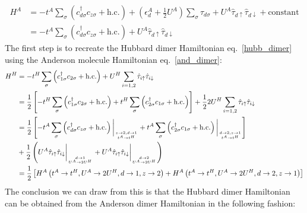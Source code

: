 \documentclass{article}
\numberwithin{equation}{section}
\begin{document}
\begin{equation}\begin{aligned}
	\label{and_dimer}
	H^A &= -t^A\sum_{\sigma}\left(c^\dagger_{d\sigma}c_{z\sigma} + \text{h.c.}\right) + \left(\epsilon_d^A + \frac{1}{2}U^A\right) \sum_{\sigma}\hat \tau_{d\sigma} + U^A\hat \tau_{d \uparrow}\hat \tau_{d \downarrow} + \text{constant}\\
	    &= -t^A\sum_{\sigma}\left(c^\dagger_{d\sigma}c_{z\sigma} + \text{h.c.}\right) + U^A\hat \tau_{d \uparrow}\hat \tau_{d \downarrow}
\end{aligned}\end{equation}
The first step is to recreate the Hubbard dimer Hamiltonian eq.~\ref{hubb_dimer} using the Anderson molecule Hamiltonian eq.~\ref{and_dimer}:
\begin{equation}\begin{aligned}
	H^H &= -t^H\sum_{\sigma}\left(c^\dagger_{1\sigma}c_{2\sigma} + \text{h.c.}\right) + U^H\sum_{i=1,2}\hat \tau_{i \uparrow}\hat \tau_{i \downarrow}\\
	    &= \frac{1}{2}\left[-t^H\sum_{\sigma}\left(c^\dagger_{1\sigma}c_{2\sigma} + \text{h.c.}\right) + t^H\sum_{\sigma}\left(c^\dagger_{2\sigma}c_{1\sigma} + \text{h.c.}\right)\right] + \frac{1}{2} 2U^H\sum_{i=1,2}\hat \tau_{i \uparrow}\hat \tau_{i \downarrow}\\
	    &= \frac{1}{2}\left[-t^A\sum_{\sigma}\left(c^\dagger_{d\sigma}c_{z\sigma} + \text{h.c.}\right)\bigg\vert_{z \to 2, d \to 1\atop{t^A \to t^H}} + t^A\sum_{\sigma}\left(c^\dagger_{2\sigma}c_{1\sigma} + \text{h.c.}\right)\bigg\vert_{d \to 2,z \to 1\atop{t^A \to t^H}} \right] \\
	    &+ \frac{1}{2} \left(U^A\hat \tau_{i \uparrow}\hat \tau_{i \downarrow}\bigg\vert_{d \to 1\atop{U^A \to 2U^H}} + U^A\hat \tau_{i \uparrow}\hat \tau_{i \downarrow}\bigg\vert_{d \to 2\atop{U^A \to 2U^H}}\right)\\
	    &=\frac{1}{2}\left[H^A\left(t^A \to t^H, U^A \to 2U^H, d \to 1, z \to 2\right) + H^A\left(t^A \to t^H, U^A \to 2U^H, d \to 2, z \to 1\right)\right]
\end{aligned}\end{equation}
The conclusion we can draw from this is that the Hubbard dimer Hamiltonian can be obtained from the Anderson dimer Hamiltonian in the following fashion:
\end{document}
